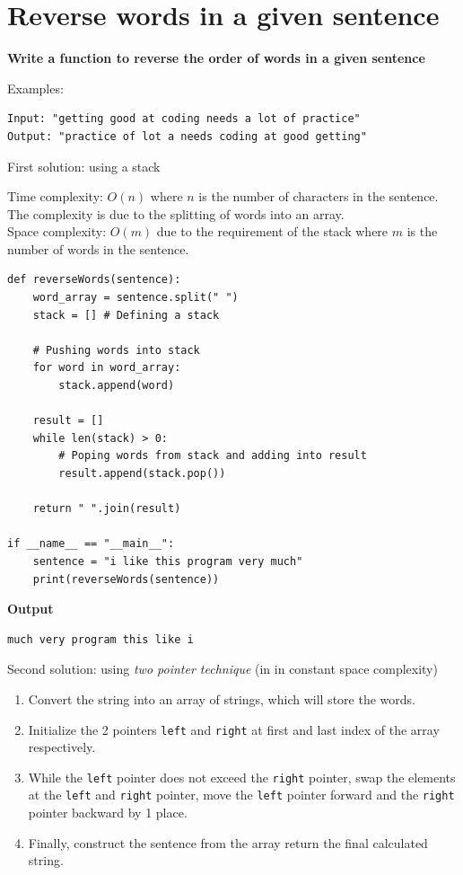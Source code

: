 \documentclass[a4paper,11pt]{book}
\begin{document}
\newpage
\section{Reverse words in a given sentence}
\textbf{Write a function to reverse the order of words in a given sentence}
\vspace{5mm}

\noindent Examples:
\begin{lstlisting}
Input: "getting good at coding needs a lot of practice"
Output: "practice of lot a needs coding at good getting"
\end{lstlisting}
\vspace{5mm}

\noindent First solution: using a stack
\vspace{5mm}

\noindent Time complexity: $O(n)$ where $n$ is the number of characters in the sentence. The complexity is due to the splitting of words into an array.\\
\noindent Space complexity: $O(m)$ due to the requirement of the stack where $m$ is the number of words in the sentence.
\begin{lstlisting}
def reverseWords(sentence):
    word_array = sentence.split(" ")
    stack = [] # Defining a stack

    # Pushing words into stack
    for word in word_array:
        stack.append(word)

    result = []
    while len(stack) > 0:
        # Poping words from stack and adding into result
        result.append(stack.pop())
  
    return " ".join(result)

if __name__ == "__main__":
    sentence = "i like this program very much"
    print(reverseWords(sentence))
\end{lstlisting}
\textbf{Output}
\begin{lstlisting}
much very program this like i
\end{lstlisting}

\noindent Second solution: using \textit{two pointer technique} (in in constant space complexity)
\begin{enumerate}
    \item Convert the string into an array of strings, which will store the words.
    \item Initialize the 2 pointers \lstinline{left} and \lstinline{right} at first and last index of the array respectively.
    \item While the \lstinline{left} pointer does not exceed the \lstinline{right} pointer, swap the elements at the \lstinline{left} and \lstinline{right} pointer, move the \lstinline{left} pointer forward and the \lstinline{right} pointer backward by 1 place.
    \item Finally, construct the sentence from the array return the final calculated string.
\end{enumerate}
\end{document}
